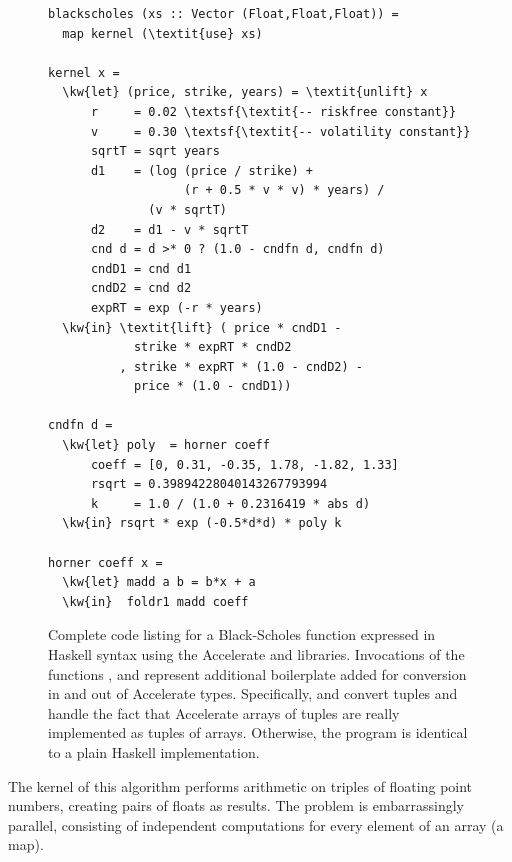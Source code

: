 \begin{figure}
\begin{footnotesize}
\begin{Verbatim}[frame=single, commandchars=\\\{\}]
blackscholes (xs :: Vector (Float,Float,Float)) = 
  map kernel (\textit{use} xs)

kernel x =
  \kw{let} (price, strike, years) = \textit{unlift} x
      r     = 0.02 \textsf{\textit{-- riskfree constant}}
      v     = 0.30 \textsf{\textit{-- volatility constant}}
      sqrtT = sqrt years
      d1    = (log (price / strike) + 
                   (r + 0.5 * v * v) * years) / 
              (v * sqrtT)
      d2    = d1 - v * sqrtT
      cnd d = d >* 0 ? (1.0 - cndfn d, cndfn d)
      cndD1 = cnd d1
      cndD2 = cnd d2
      expRT = exp (-r * years)
  \kw{in} \textit{lift} ( price * cndD1 - 
            strike * expRT * cndD2
          , strike * expRT * (1.0 - cndD2) - 
            price * (1.0 - cndD1))

cndfn d =
  \kw{let} poly  = horner coeff
      coeff = [0, 0.31, -0.35, 1.78, -1.82, 1.33]
      rsqrt = 0.39894228040143267793994
      k     = 1.0 / (1.0 + 0.2316419 * abs d)
  \kw{in} rsqrt * exp (-0.5*d*d) * poly k

horner coeff x = 
  \kw{let} madd a b = b*x + a
  \kw{in}  foldr1 madd coeff
\end{Verbatim}
\end{footnotesize}
\caption{Complete code listing for a Black-Scholes function expressed
  in Haskell syntax using the Accelerate and \systemname{} libraries.
  Invocations of the functions ,  and 
represent additional boilerplate added for
  conversion in and out of Accelerate types.  Specifically,  and
   convert tuples and handle the fact that Accelerate
  arrays of tuples are really implemented as tuples of arrays.
  Otherwise, the program is identical to a plain Haskell
  implementation.}
\label{fig:blackscholes}
\end{figure}





The kernel of this algorithm performs arithmetic on triples of
floating point numbers, creating pairs of floats as results. The problem 
is embarrassingly parallel, consisting of independent computations
for every element of an array (a map).

